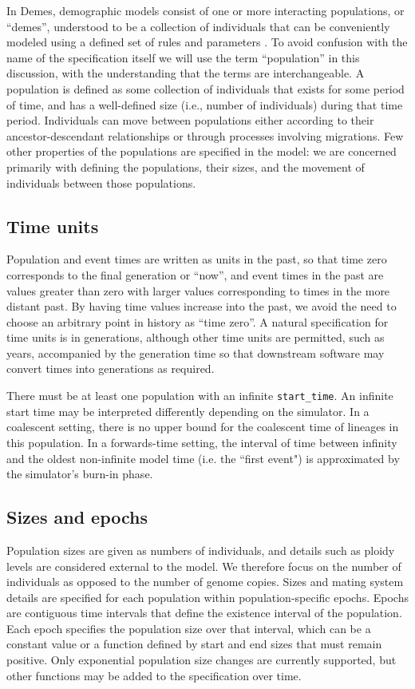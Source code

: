\documentclass[11pt]{article}
\begin{document}
In Demes, demographic models consist of one or more interacting populations,
or ``demes'', understood to be a collection of individuals that can be
conveniently modeled using a defined set of rules and parameters
\citep{gilmour_demes_1939,gilmour_deme_1955}.
To avoid confusion with the name of the specification itself we will
use the term ``population'' in this discussion, with the understanding that the
terms are interchangeable.
A population is defined as some collection of individuals that exists for
some period of time, and has a well-defined size (i.e., number of individuals)
during that time period. Individuals can move between populations
either according to their ancestor-descendant relationships
or through processes involving migrations.
Few other properties of the populations are specified in the model:
we are concerned primarily with defining the populations, their sizes, and the
movement of individuals between those populations.

\subsection{Time units}

Population and event times are written as units in the past, so that time zero
corresponds to the final generation or ``now'', and event times in the past are
values greater than zero with larger values corresponding to times in the more
distant past. By having time values increase into the past, we avoid the need to
choose an arbitrary point in history as ``time zero''. A natural
specification for time units is in generations, although other time units are
permitted, such as years, accompanied by the generation time
so that downstream software may convert times into generations as required.

There must be at least one population with an infinite \texttt{start\_time}.
An infinite start time may be interpreted differently depending on the simulator.
In a coalescent setting, there is no upper bound for the coalescent time
of lineages in this population.
In a forwards-time setting, the interval of time between infinity and
the oldest non-infinite model time (i.e. the ``first event") is approximated
by the simulator's burn-in phase.

\subsection{Sizes and epochs}

Population sizes are given as numbers of individuals, and details
such as ploidy levels are considered external to the model.
We therefore focus on the number of individuals as opposed
to the number of genome copies.
Sizes and mating system details are specified for each population within
population-specific epochs.
Epochs are contiguous time intervals that define
the existence interval of the population. Each epoch specifies the population size
over that interval, which can be a constant value or a function defined by start
and end sizes that must remain positive.
Only exponential population size changes are currently supported,
but other functions may be added to the specification over time.
\end{document}
